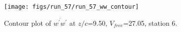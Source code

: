 \begin{figure}[H]
\centering
\texttt{[image: figs/run\_57/run\_57\_ww\_contour]}
\caption{Contour plot of $\overline{w^\prime w^\prime}$ at $z/c$=9.50, $V_{free}$=27.05, station 6.}
\end{figure}


